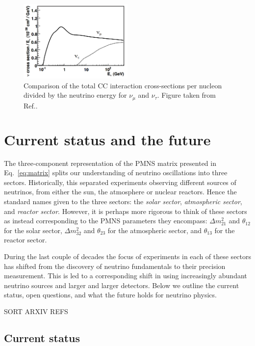 \begin{figure} %
    \includegraphics[origin=c,width=0.5\textwidth]{diagrams/3-theory/tau_comparison.png}
    \caption[tau comparison short]
    {Comparison of the total CC interaction cross-sections per nucleon divided by the neutrino
        energy for $\nu_{\mu}$ and $\nu_{\tau}$. Figure taken from Ref.\cite{formaggio2012}.}
    \label{fig:tau_comparison}
\end{figure}

\section{Current status and the future}

The three-component representation of the PMNS matrix presented in Eq.~\ref{eq:matrix} splits our
understanding of neutrino oscillations into three sectors. Historically, this separated
experiments observing different sources of neutrinos, from either the sun, the atmosphere or
nuclear reactors. Hence the standard names given to the three sectors: the \emph{solar sector},
\emph{atmospheric sector}, and \emph{reactor sector}. However, it is perhaps more rigorous to
think of these sectors as instead corresponding to the PMNS parameters they encompass: $\Delta
    m^{2}_{21}$ and $\theta_{12}$ for the solar sector, $\Delta m^{2}_{32}$ and $\theta_{23}$ for the
atmospheric sector, and $\theta_{13}$ for the reactor sector.

During the last couple of decades the focus of experiments in each of these sectors has shifted
from the discovery of neutrino fundamentals to their precision measurement. This is led to a
corresponding shift in using increasingly abundant neutrino sources and larger and larger
detectors. Below we outline the current status, open questions, and what the future holds for
neutrino physics.

SORT ARXIV REFS

\subsection{Current status} %
\label{sec:theory_status_current} %

